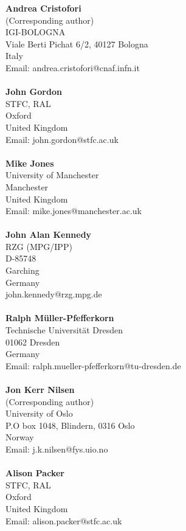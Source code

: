 \textbf{Andrea Cristofori} \\
(Corresponding author) \\
IGI-BOLOGNA \\
Viale Berti Pichat 6/2, 40127 Bologna \\
Italy \\
Email: andrea.cristofori@cnaf.infn.it \\
\\
\textbf{John Gordon} \\
STFC, RAL \\
Oxford \\
United Kingdom \\
Email: john.gordon@stfc.ac.uk \\
\\
\textbf{Mike Jones} \\
University of Manchester \\
Manchester \\
United Kingdom \\
Email: mike.jones@manchester.ac.uk \\
\\
\textbf{John Alan Kennedy} \\
RZG (MPG/IPP) \\
D-85748 \\
Garching \\
Germany \\
john.kennedy@rzg.mpg.de \\
\\
\textbf{Ralph M\"uller-Pfefferkorn} \\
Technische Universität Dresden \\
01062 Dresden \\
Germany \\
Email: ralph.mueller-pfefferkorn@tu-dresden.de \\
\\
\textbf{Jon Kerr Nilsen} \\
(Corresponding author) \\
University of Oslo \\
P.O box 1048, Blindern, 0316 Oslo \\
Norway \\
Email: j.k.nilsen@fys.uio.no \\
\\
\newpage
\textbf{Alison Packer} \\
STFC, RAL \\
Oxford \\
United Kingdom \\
Email: alison.packer@stfc.ac.uk \\
\\
